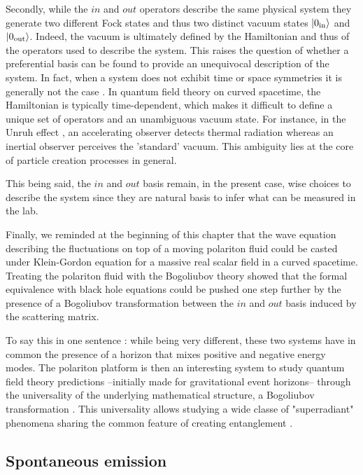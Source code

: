 Secondly, while the $in$ and $out$ operators describe the same physical system they generate two different Fock states and thus two distinct vacuum states $\ket{0_{\mathrm{in}}}$ and $\ket{0_{\mathrm{out}}}$. Indeed, the vacuum 
is ultimately defined by the Hamiltonian and thus of the operators used to describe the system.
This raises the question of whether a preferential basis can be found to provide an unequivocal description of the system. In fact, when a system does not exhibit time or space symmetries it is generally not the case \cite{qft_wald_chicago_1994}. In quantum field theory on curved spacetime, the Hamiltonian is typically time-dependent, which makes it difficult to define a unique set of operators and an unambiguous vacuum state. For instance, in the Unruh effect \cite{unruh_!notes_1976}, an accelerating observer detects thermal radiation whereas an inertial observer perceives the 'standard' vacuum. 
This ambiguity lies at the core of particle creation processes in general.

 This being said, the $in$ and $out$ basis remain, in the present case, wise choices to describe the system since they are natural basis to infer what can be measured in the lab.

\bigskip

Finally, we reminded at the beginning of this chapter that the wave equation describing the fluctuations on top of a moving polariton fluid could be casted under Klein-Gordon 
equation for a massive real scalar field in a curved spacetime. Treating the polariton fluid with the Bogoliubov theory showed that the formal equivalence with black hole equations
could be pushed one step further by the presence of a Bogoliubov transformation between the $in$ and $out$ basis induced by the scattering matrix.

To say this in one sentence : while being very different, these two systems have in common the presence of a horizon that mixes positive and negative energy modes. The polariton platform is then an interesting system to study quantum field theory predictions --initially made for gravitational event horizons-- through the universality of the underlying 
mathematical structure, a Bogoliubov transformation \cite{unruh_universality_2005,hangleiter_analogue_2022}. This universality allows studying a wide classe of "superradiant" phenomena \cite{brito_superradiance_2020_lectures} sharing the common feature of creating entanglement \cite{rot_supperradiance_delhom}.

\subsection{Spontaneous emission}

